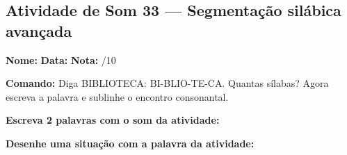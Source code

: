 \subsection{Atividade de Som 33 --- Segmentação silábica avançada}
\begin{exercicio}



\noindent\textbf{Nome:} \underline{\hspace{3.2cm}} \quad \textbf{Data:} \underline{\hspace{1.6cm}} \quad \textbf{Nota:} \underline{\hspace{0.9cm}}/10


\noindent\textbf{Comando:} Diga BIBLIOTECA: BI-BLIO-TE-CA. Quantas sílabas? Agora escreva a palavra e sublinhe o encontro consonantal.


\begin{center}
\end{center}

\noindent\textbf{Escreva 2 palavras com o som da atividade:}

\begin{center}
  \underline{\hspace{3cm}} \quad \underline{\hspace{3cm}}
\end{center}

\noindent\textbf{Desenhe uma situação com a palavra da atividade:}

\begin{center}
\end{center}

\end{exercicio}



